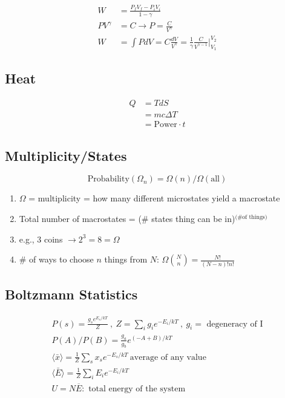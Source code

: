 \documentclass[10pt,a4paper]{article}
\begin{document}
\begin{align}
 W &= \frac{P_fV_f-P_iV_i}{1-\gamma}\\
 PV^\gamma  &= C \rightarrow P = \frac{C}{V^\gamma}\\
 W&= \int PdV = C\frac{dV}{V^\gamma} = \frac{1}{\gamma}\frac{C}{V^{\gamma - 1}} \Big\lvert ^{V_2}_{V_1}
\end{align}

\subsection{Heat}
\begin{align}
 Q &= TdS\\
 &= mc \Delta T\\
 &= \textrm{Power} \cdot t
\end{align}

\subsection{Multiplicity/States}
\begin{equation}
 \textrm{Probability}(\Omega_n) = \Omega(n)/\Omega(\textrm{all})
\end{equation}


\begin{enumerate}
    \item  $\Omega$ = multiplicity = how many different microstates yield a macrostate
    \item Total number of macrostates = (\# states thing can be in)$^\textrm{{(\# of things)}}$
    \item e.g., 3 coins $\rightarrow 2^3 = 8 = \Omega$
    \item \# of ways to choose $n$ things from $N$: $\Omega \binom{N}{n} = \frac{N!}{(N-n)!n!}$
\end{enumerate}

\subsection{Boltzmann Statistics}
\begin{align}
 P(s) = \frac{g_se^{E_s/kT}}{Z}~,~ Z = \sum\limits_i g_i e^{-E_i/kT}~,~g_i = \textrm{ degeneracy of I}\\
 P(A)/P(B) = \frac{g_a}{g_b} e^{(-A + B)/kT}\\
\langle \bar{x} \rangle = \frac{1}{Z}\sum \limits_s x_s e^{-E_s/kT}~ \textrm{average of any value}\\
\langle \bar{E} \rangle = \frac{1}{Z}\sum \limits_i E_i e^{-E_i/kT}\\
U=N\overline{E}: \textrm{ total energy of the system}
\end{align}
\end{document}
